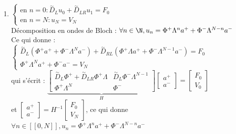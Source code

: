 \documentclass[12pt,a4paper]{article}
\begin{document}
\begin{sol}
\begin{enumerate}
		\item \begin{minipage}[t]{18.5cm}
			$\begin{cases}
			\text{en }n=0 : \overset\sim D_L u_0 + \overset\sim D_{LR} u_1 = F_0 \\
			\text{en }n=N : u_N = V_N
		\end{cases}$\\
		Décomposition en ondes de Bloch : $\forall n \in \N, u_n = \Phi^+\Lambda^n a^+ + \Phi^-\Lambda^{N-n}a^-$\\
		Ce qui donne : $\begin{cases}
			\overset\sim D_L\left(\Phi^+a^+ + \Phi^- \Lambda^Na^-\right)+\overset\sim D_{RL}\left(\Phi^+ \Lambda a^+ + \Phi^-\Lambda^{N-1}a^-\right) = F_0 \\
			\Phi^+\Lambda^Na^+ + \Phi^-a^- = V_N
		\end{cases}$\\
		qui s'écrit : $\underbrace{\begin{bmatrix}
				\overset\sim D_L\Phi^+ + \overset\sim D_{LR}\Phi^+\Lambda & \overset\sim D_L\Phi^-\Lambda^{N-1}\\
				\Phi^+ \Lambda^N&  \Phi^-
		\end{bmatrix}}_H\begin{bmatrix}
		a^+ \\ a^-
	\end{bmatrix}= \begin{bmatrix}
	F_0 \\ V_0
	\end{bmatrix}$\\
	et $\begin{bmatrix}
	a^+ \\ a^-
	\end{bmatrix}= H^{-1}\begin{bmatrix}
	F_0 \\ V_N
	\end{bmatrix}$, ce qui donne $\forall n \in [\![0,N]\!], u_n = \Phi^+\Lambda^na^+ + \Phi^- \Lambda^{N-n}a^-$
		\end{minipage}
		\end{enumerate}
	\end{sol}
	
	\vspace{4.5cm}
	
\end{document}
